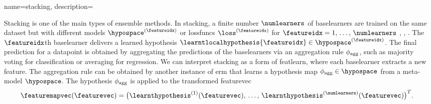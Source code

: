 {name={stacking}, 
	description={Stacking is one of the main types of \gls{ensemble} methods.  
		In stacking, a finite number $\numlearners$ of \glspl{baselearner} are trained on the 
		same \gls{dataset} but with different \glspl{model} $\hypospace^{(\featureidx)}$ 
		or \glspl{lossfunc} $\loss^{(\featureidx)}$ for $\featureidx=1,\,\ldots,\,\numlearners$ \cite[Ch. 8.8]{hastie01statisticallearning},
		\cite{WOLPERT1992241}, \cite{ZhouEnsemble2012}. 
		The $\featureidx$th \gls{baselearner} delivers a learned \gls{hypothesis} 
		$\learntlocalhypothesis{\featureidx} \in \hypospace^{(\featureidx)}$. 
		The final \gls{prediction} for a \gls{datapoint} is obtained by aggregating the 
		\glspl{prediction} of the \glspl{baselearner} via an aggregation rule $\phi_{\rm agg}$, 
		such as majority voting for \gls{classification} or averaging for \gls{regression}. 
		We can interpret stacking as a form of \gls{featlearn}, where each \gls{baselearner} 
		extracts a new \gls{feature}. The aggregation rule can be obtained by another instance 
		of \gls{erm} that learns a \gls{hypothesis} \gls{map} $\phi_{\rm agg} \in \hypospace$ from 
		a meta-\gls{model} $\hypospace$. The \gls{hypothesis} $\phi_{\rm agg}$ is applied to the 
		transformed \gls{featurevec} $$\featuremapvec(\featurevec)= \big( \learnthypothesis^{(1)}(\featurevec), 
       		\,\ldots, \,\learnthypothesis^{(\numlearners)}(\featurevec) \big)^{T}.$$
       		\begin{figure}[H]
			\begin{center}
\end{center}
\end{figure}}}
